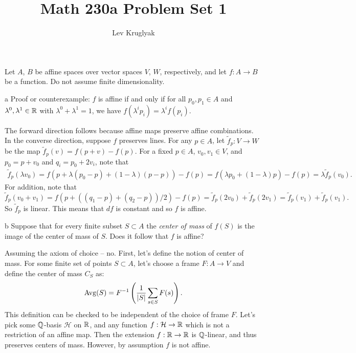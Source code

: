 \documentclass{../../templates/lkx_pset}
\title{Math 230a Problem Set 1}
\author{Lev Kruglyak}
\begin{document}
\maketitle

\begin{problem}{2}
  Let $A$, $B$ be affine spaces over vector spaces $V$, $W$, respectively, and let $f : A \to B$ be a function. Do not assume finite dimensionality.
\end{problem}

\begin{parts}
  \begin{part}{a}
    Proof or counterexample: $f$ is affine if and only if for all $p_0, p_1\in A$ and $\lambda^0, \lambda^1\in \mathbb{R}$ with $\lambda^0 + \lambda^1=1$, we have $f(\lambda^ip_i) = \lambda^i f(p_i)$.
  \end{part}

  The forward direction follows because affine maps preserve affine combinations. In the converse direction, suppose $f$ preserves lines. For any $p\in A$, let $\widetilde{f}_p : V \to W$ be the map $\widetilde{f}_p(v) = f(p+v)-f(p)$. For a fixed $p\in A$, $v_0, v_1\in V$, and $p_0 = p+v_0$ and $q_i = p_0 + 2v_i$, note that
  \[
    \begin{aligned}
      \widetilde{f}_p(\lambda v_0) =  f(p+\lambda (p_0 - p) + (1-\lambda)(p-p)) - f(p) = f(\lambda p_0 + (1-\lambda) p) - f(p) = \lambda \widetilde{f}_p(v_0).
    \end{aligned}
  \]
  For addition, note that
  \[
    \widetilde{f}_p(v_0 + v_1) = f(p+((q_1- p)+(q_2-p))/2)  - f(p) = \widetilde{f}_p(2v_0) + \widetilde{f}_p(2v_1) = \widetilde{f}_p(v_1)+\widetilde{f}_p(v_1).
  \]
  So $\widetilde{f}_p$ is linear. This means that $df$ is constant and so $f$ is affine.

  \begin{part}{b}
    Suppose that for every finite subset $S\subset A$ the \emph{center of mass} of $f(S)$ is the image of the center of mass of $S$. Does it follow that $f$ is affine?
  \end{part}
  
  Assuming the axiom of choice -- no. First, let's define the notion of center of mass. For some finite set of points $S\subset A$, let's choose a frame $F : A \to V$ and define the center of mass $C_S$ as:
  \[
    \operatorname{Avg}(S) = F^{-1}\left(\frac{1}{|S|}\sum_{s\in S} F(s)\right).
  \]
  This definition can be checked to be independent of the choice of frame $F$. Let's pick some $\mathbb{Q}$-basis $\mathcal{H}$ on $\mathbb{R}$, and any function $f  : \mathcal{H} \to \mathbb{R}$ which is not a restriction of an affine map. Then the extension $f : \mathbb{R} \to \mathbb{R}$ is $\mathbb{Q}$-linear, and thus preserves centers of mass. However, by assumption $f$ is not affine.


\end{parts}
\end{document}
